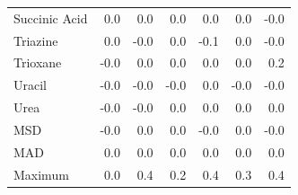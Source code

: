 \begin{table}[h]
\begin{tabular}{lrrrrrr}
Succinic Acid & 0.0 & 0.0 & 0.0 & 0.0 & 0.0 & -0.0 \\
Triazine & 0.0 & -0.0 & 0.0 & -0.1 & 0.0 & -0.0 \\
Trioxane & -0.0 & 0.0 & 0.0 & 0.0 & 0.0 & 0.2 \\
Uracil & -0.0 & -0.0 & -0.0 & 0.0 & -0.0 & -0.0 \\
Urea & -0.0 & -0.0 & 0.0 & 0.0 & 0.0 & 0.0 \\
MSD & -0.0 & 0.0 & 0.0 & -0.0 & 0.0 & -0.0 \\
MAD & 0.0 & 0.0 & 0.0 & 0.0 & 0.0 & 0.0 \\
Maximum & 0.0 & 0.4 & 0.2 & 0.4 & 0.3 & 0.4 \\
\bottomrule
\end{tabular}

\end{table}